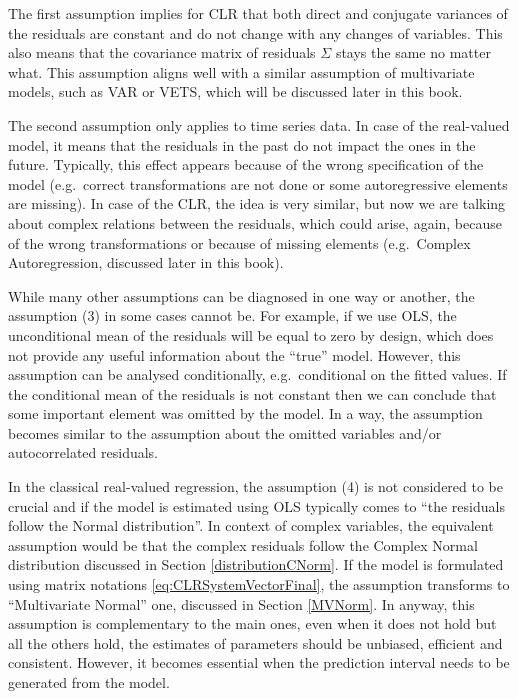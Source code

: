 \documentclass[
]{book}
\begin{document}
The first assumption implies for CLR that both direct and conjugate variances of the residuals are constant and do not change with any changes of variables. This also means that the covariance matrix of residuals \(\Sigma\) stays the same no matter what. This assumption aligns well with a similar assumption of multivariate models, such as VAR or VETS, which will be discussed later in this book.

The second assumption only applies to time series data. In case of the real-valued model, it means that the residuals in the past do not impact the ones in the future. Typically, this effect appears because of the wrong specification of the model (e.g.~correct transformations are not done or some autoregressive elements are missing). In case of the CLR, the idea is very similar, but now we are talking about complex relations between the residuals, which could arise, again, because of the wrong transformations or because of missing elements (e.g.~Complex Autoregression, discussed later in this book).

While many other assumptions can be diagnosed in one way or another, the assumption (3) in some cases cannot be. For example, if we use OLS, the unconditional mean of the residuals will be equal to zero by design, which does not provide any useful information about the ``true'' model. However, this assumption can be analysed conditionally, e.g.~conditional on the fitted values. If the conditional mean of the residuals is not constant then we can conclude that some important element was omitted by the model. In a way, the assumption becomes similar to the assumption about the omitted variables and/or autocorrelated residuals.

In the classical real-valued regression, the assumption (4) is not considered to be crucial and if the model is estimated using OLS typically comes to ``the residuals follow the Normal distribution''. In context of complex variables, the equivalent assumption would be that the complex residuals follow the Complex Normal distribution discussed in Section \ref{distributionCNorm}. If the model is formulated using matrix notations \eqref{eq:CLRSystemVectorFinal}, the assumption transforms to ``Multivariate Normal'' one, discussed in Section \ref{MVNorm}. In anyway, this assumption is complementary to the main ones, even when it does not hold but all the others hold, the estimates of parameters should be unbiased, efficient and consistent. However, it becomes essential when the prediction interval needs to be generated from the model.
\end{document}
